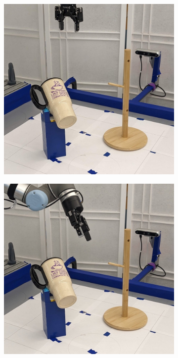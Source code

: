 \documentclass{article}
\begin{document}
\begin{figure}[]
    \centering

    \begin{subfigure}{(\linewidth - 0.05\linewidth)/5}
        \centering
        \includegraphics[width=\linewidth]{figures/episodes/mug_on_tree_zoom/1.jpg}
    \end{subfigure}
    \begin{subfigure}{(\linewidth - 0.05\linewidth)/5}
        \centering
        \includegraphics[width=\linewidth]{figures/episodes/mug_on_tree_zoom/2.jpg}

\end{subfigure}
\end{figure}
\end{document}
